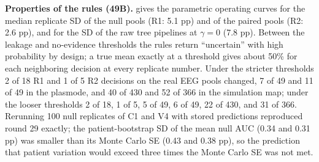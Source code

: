 \textbf{Properties of the rules (49B).}  gives the parametric operating curves for the median replicate SD of the null pools (R1: 5.1 pp) and of the paired pools (R2: 2.6 pp), and for the SD of the raw tree pipelines at $\gamma=0$ (7.8 pp). Between the leakage and no-evidence thresholds the rules return ``uncertain'' with high probability by design; a true mean exactly at a threshold gives about 50\% for each neighboring decision at every replicate number. Under the stricter thresholds 2 of 18 R1 and 1 of 5 R2 decisions on the real EEG pools changed, 7 of 49 and 11 of 49 in the plasmode, and 40 of 430 and 52 of 366 in the simulation map; under the looser thresholds 2 of 18, 1 of 5, 5 of 49, 6 of 49, 22 of 430, and 31 of 366. Rerunning 100 null replicates of C1 and V4 with stored predictions reproduced round 29 exactly; the patient-bootstrap SD of the mean null AUC (0.34 and 0.31 pp) was smaller than its Monte Carlo SE (0.43 and 0.38 pp), so the prediction that patient variation would exceed three times the Monte Carlo SE was not met.
